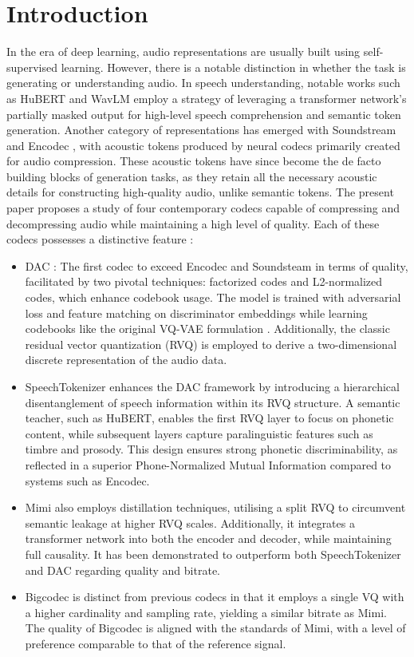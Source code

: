 \documentclass{Interspeech}
\begin{document}
\section{Introduction}
\label{sec:intro}
In the era of deep learning, audio representations are usually built using self-supervised learning. However, there is a notable distinction in whether the task is generating or understanding audio. In speech understanding, notable works such as HuBERT \cite{hsu2021hubert} and WavLM \cite{chen2022wavlm} employ a strategy of leveraging a transformer network's partially masked output for high-level speech comprehension and semantic token generation. Another category of representations has emerged with Soundstream \cite{zeghidour2021soundstream} and Encodec \cite{defossez2022high}, with acoustic tokens produced by neural codecs primarily created for audio compression. These acoustic tokens have since become the de facto building blocks of generation tasks, as they retain all the necessary acoustic details for constructing high-quality audio, unlike semantic tokens. The present paper proposes a study of four contemporary codecs capable of compressing and decompressing audio while maintaining a high level of quality. Each of these codecs possesses a distinctive feature :
\begin{itemize}
\item DAC \cite{kumar2024high}: The first codec to exceed Encodec and Soundsteam in terms of quality, facilitated by two pivotal techniques: factorized codes and L2-normalized codes, which enhance codebook usage. The model is trained with adversarial loss and feature matching on discriminator embeddings while learning codebooks like the original VQ-VAE formulation \cite{van2017neural}. Additionally, the classic residual vector quantization (RVQ) is employed to derive a two-dimensional discrete representation of the audio data.
\item SpeechTokenizer \cite{zhang2023speechtokenizer} enhances the DAC framework by introducing a hierarchical disentanglement of speech information within its RVQ structure. A semantic teacher, such as HuBERT, enables the first RVQ layer to focus on phonetic content, while subsequent layers capture paralinguistic features such as timbre and prosody. This design ensures strong phonetic discriminability, as reflected in a superior Phone-Normalized Mutual Information compared to systems such as Encodec.
\item Mimi \cite{defossez2024moshi} also employs distillation techniques, utilising a split RVQ to circumvent semantic leakage at higher RVQ scales. Additionally, it integrates a transformer network into both the encoder and decoder, while maintaining full causality. It has been demonstrated to outperform both SpeechTokenizer and DAC regarding quality and bitrate.
\item Bigcodec \cite{xin2024bigcodec} is distinct from previous codecs in that it employs a single VQ with a higher cardinality and sampling rate, yielding a similar bitrate as Mimi. The quality of Bigcodec is aligned with the standards of Mimi, with a level of preference comparable to that of the reference signal.
\end{itemize}
\end{document}

